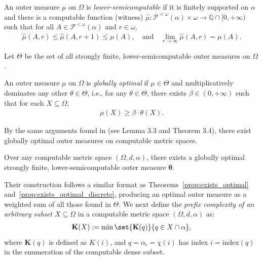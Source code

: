 \begin{definition}
    An outer measure $\mu$ on $\Omega$ is \textit{lower-semicomputable} if it is finitely supported on $\alpha$ and there is a computable function (witness) $\widehat{\mu} : \mathcal{P}^{<\omega}(\alpha) \times \omega \to \mathbb{Q} \cap [0, +\infty)$ such that for all $A \in \mathcal{P}^{<\omega}(\alpha)$ and $r \in \omega$,
    \begin{align*}
        \widehat{\mu}(A, r) \leq \widehat{\mu}(A, r + 1) \leq \mu(A), \quad \text{and} \quad 
        \lim_{r \to \infty} \widehat{\mu}(A, r) = \mu(A).
    \end{align*}
\end{definition}

Let $\Theta$ be the set of all strongly finite, lower-semicomputable outer measures on $\Omega$. 

\begin{definition}
    An outer measure $\mu$ on $\Omega$ is \textit{globally optimal} if $\mu \in \Theta$ and multiplicatively dominates any other $\theta \in \Theta$, i.e., for any $\theta \in \Theta$, there exists $\beta \in (0, +\infty)$ such that for each $X \subseteq \Omega$,
    \begin{align*}
        \mu(X) \geq \beta \cdot \theta(X). 
    \end{align*}
\end{definition}

By the same arguments found in \cite{LL20} (see Lemma 3.3 and Theorem 3.4), there exist globally optimal outer measures on computable metric spaces. 

\begin{proposition}
    Over any computable metric space $(\Omega, d, \alpha)$, there exists a globally optimal strongly finite, lower-semicomputable outer measure $\boldsymbol{\theta}$.
    \label{prop:exists_globally_optimal}
\end{proposition}
Their construction follows a similar format as Theorems~\ref{prop:exists_optimal} and~\ref{prop:exists_optimal_discrete}, producing an optimal outer measure as a weighted sum of all those found in $\Theta$. We next define the \textit{prefix complexity of an arbitrary subset $X \subseteq \Omega$} in a computable metric space $(\Omega, d, \alpha)$ as: 
\begin{align}
    \label{equation:boldface_K}
    \mathbf{K}(X) := \min \set{\mathbf{K}(q)}{q \in X \cap \alpha},
\end{align}
where $\mathbf{K}(q)$ is defined as $K(i)$, and $q = \alpha_i = \chi(i)$ has index $i = \text{index}(q)$ in the enumeration of the computable dense subset.

